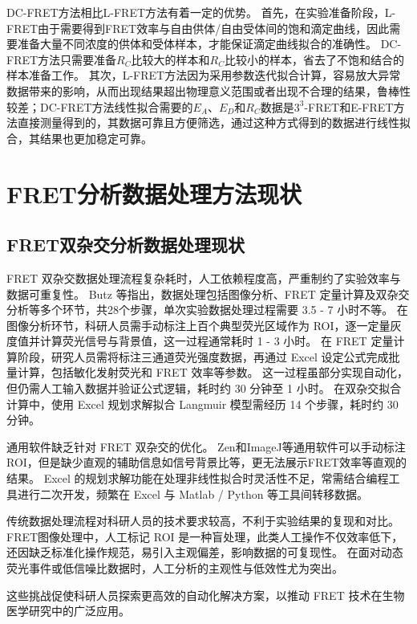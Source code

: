 DC-FRET方法相比L-FRET方法有着一定的优势。
首先，在实验准备阶段，L-FRET由于需要得到FRET效率与自由供体/自由受体间的饱和滴定曲线，因此需要准备大量不同浓度的供体和受体样本，才能保证滴定曲线拟合的准确性。
DC-FRET方法只需要准备$R_C$比较大的样本和$R_C$比较小的样本，省去了不饱和结合的样本准备工作。
其次，L-FRET方法因为采用参数迭代拟合计算，容易放大异常数据带来的影响，从而出现结果超出物理意义范围或者出现不合理的结果，鲁棒性较差；DC-FRET方法线性拟合需要的$E_A$、$E_D$和$R_C$数据是$3^3$-FRET和E-FRET方法直接测量得到的，其数据可靠且方便筛选，通过这种方式得到的数据进行线性拟合，其结果也更加稳定可靠。

\section{FRET分析数据处理方法现状}

\subsection{FRET双杂交分析数据处理现状}
FRET 双杂交数据处理流程复杂耗时，人工依赖程度高，严重制约了实验效率与数据可重复性。
Butz 等指出，数据处理包括图像分析、FRET 定量计算及双杂交分析等多个环节，共28个步骤，单次实验数据处理过程需要 3.5 - 7 小时不等。
在图像分析环节，科研人员需手动标注上百个典型荧光区域作为 ROI，逐一定量灰度值并计算荧光信号与背景值，这一过程通常耗时 1 - 3 小时。
在 FRET 定量计算阶段，研究人员需将标注三通道荧光强度数据，再通过 Excel 设定公式完成批量计算，包括敏化发射荧光和 FRET 效率等参数。
这一过程虽部分实现自动化，但仍需人工输入数据并验证公式逻辑，耗时约 30 分钟至 1 小时。
在双杂交拟合计算中，使用 Excel 规划求解拟合 Langmuir 模型需经历 14 个步骤，耗时约 30 分钟。

通用软件缺乏针对 FRET 双杂交的优化。
Zen和ImageJ等通用软件可以手动标注ROI，但是缺少直观的辅助信息如信号背景比等，更无法展示FRET效率等直观的结果。
Excel 的规划求解功能在处理非线性拟合时灵活性不足，常需结合编程工具进行二次开发，频繁在 Excel 与 Matlab / Python 等工具间转移数据。

传统数据处理流程对科研人员的技术要求较高，不利于实验结果的复现和对比。
FRET图像处理中，人工标记 ROI 是一种盲处理，此类人工操作不仅效率低下，还因缺乏标准化操作规范，易引入主观偏差，影响数据的可复现性。
在面对动态荧光事件或低信噪比数据时，人工分析的主观性与低效性尤为突出。

这些挑战促使科研人员探索更高效的自动化解决方案，以推动 FRET 技术在生物医学研究中的广泛应用。

